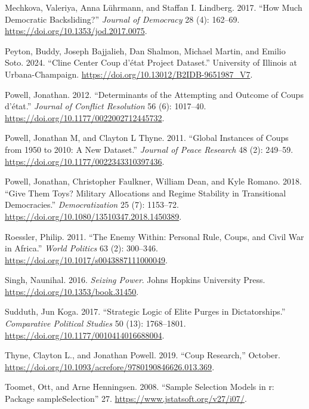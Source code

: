 \documentclass[
  12pt,
]{report}
\newlength{\cslhangindent}
\newenvironment{CSLReferences}[2] %
 {\begin{list}{}{%
  \setlength{\itemindent}{0pt}
  \setlength{\leftmargin}{0pt}
  \setlength{\parsep}{0pt}
  \ifodd #1
   \setlength{\leftmargin}{\cslhangindent}
   \setlength{\itemindent}{-1\cslhangindent}
  \fi
  \setlength{\itemsep}{#2\baselineskip}}}
 {\end{list}}
\begin{document}
\begin{CSLReferences}{1}{0}
Mechkova, Valeriya, Anna Lührmann, and Staffan I. Lindberg. 2017. {``How
Much Democratic Backsliding?''} \emph{Journal of Democracy} 28 (4):
162--69. \url{https://doi.org/10.1353/jod.2017.0075}.

Peyton, Buddy, Joseph Bajjalieh, Dan Shalmon, Michael Martin, and Emilio
Soto. 2024. {``Cline Center Coup d{'}état Project Dataset.''} University
of Illinois at Urbana-Champaign.
\url{https://doi.org/10.13012/B2IDB-9651987_V7}.

Powell, Jonathan. 2012. {``Determinants of the Attempting and Outcome of
Coups d{'}état.''} \emph{Journal of Conflict Resolution} 56 (6):
1017--40. \url{https://doi.org/10.1177/0022002712445732}.

Powell, Jonathan M, and Clayton L Thyne. 2011. {``Global Instances of
Coups from 1950 to 2010: A New Dataset.''} \emph{Journal of Peace
Research} 48 (2): 249--59.
\url{https://doi.org/10.1177/0022343310397436}.

Powell, Jonathan, Christopher Faulkner, William Dean, and Kyle Romano.
2018. {``Give Them Toys? Military Allocations and Regime Stability in
Transitional Democracies.''} \emph{Democratization} 25 (7): 1153--72.
\url{https://doi.org/10.1080/13510347.2018.1450389}.

Roessler, Philip. 2011. {``The Enemy Within: Personal Rule, Coups, and
Civil War in Africa.''} \emph{World Politics} 63 (2): 300--346.
\url{https://doi.org/10.1017/s0043887111000049}.

Singh, Naunihal. 2016. \emph{Seizing Power}. Johns Hopkins University
Press. \url{https://doi.org/10.1353/book.31450}.

Sudduth, Jun Koga. 2017. {``Strategic Logic of Elite Purges in
Dictatorships.''} \emph{Comparative Political Studies} 50 (13):
1768--1801. \url{https://doi.org/10.1177/0010414016688004}.

Thyne, Clayton L., and Jonathan Powell. 2019. {``Coup Research,''}
October. \url{https://doi.org/10.1093/acrefore/9780190846626.013.369}.

Toomet, Ott, and Arne Henningsen. 2008. {``Sample Selection Models in
{\textbraceleft}r{\textbraceright}: Package
{\textbraceleft}sampleSelection{\textbraceright}''} 27.
\url{https://www.jstatsoft.org/v27/i07/}.

\end{CSLReferences}
\end{document}
